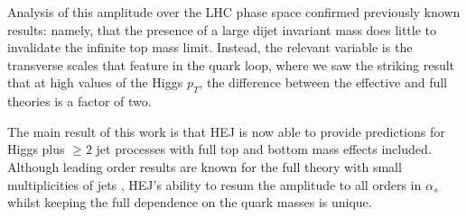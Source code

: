 Analysis of this amplitude over the LHC phase space confirmed previously known results: namely, that the presence of a large dijet invariant mass does little to invalidate the infinite top mass limit. Instead, the relevant variable is the transverse scales that feature in the quark loop, where we saw the striking result that at high values of the Higgs $p_T$, the difference between the effective and full theories is a factor of two. 

The main result of this work is that HEJ is now able to provide predictions for Higgs plus $\geq 2$ jet processes with full top and bottom mass effects included. Although leading order results are known for the full theory with small multiplicities of jets \cite{DelDuca2001a, Neumann2016}, HEJ's ability to resum the amplitude to all orders in $\alpha_s$ whilst keeping the full dependence on the quark masses is unique. 

